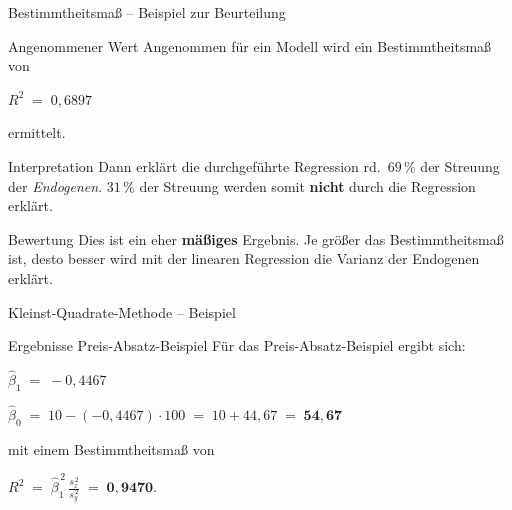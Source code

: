 \documentclass[aspectratio=169,11pt]{beamer}
\begin{document}
\begin{frame}{Bestimmtheitsmaß -- Beispiel zur Beurteilung}
  \begin{block}{Angenommener Wert}
    Angenommen für ein Modell wird ein Bestimmtheitsmaß von
    \begin{center}
      $\displaystyle R^{2} \;=\; 0{,}6897$
    \end{center}
    ermittelt.
  \end{block}

  \begin{exampleblock}{Interpretation}
    Dann erklärt die durchgeführte Regression rd.\ $69\,\%$ der
    Streuung der \emph{Endogenen}. $31\,\%$ der Streuung werden somit
    \textbf{nicht} durch die Regression erklärt.
  \end{exampleblock}

  \begin{alertblock}{Bewertung}
    Dies ist ein eher \textbf{mäßiges} Ergebnis. Je größer das
    Bestimmtheitsmaß ist, desto besser wird mit der linearen
    Regression die Varianz der Endogenen erklärt.
  \end{alertblock}
\end{frame}

\begin{frame}{Kleinst-Quadrate-Methode -- Beispiel}
  \begin{block}{Ergebnisse Preis-Absatz-Beispiel}
    Für das Preis-Absatz-Beispiel ergibt sich:
    \begin{center}
      $\displaystyle
        \hat{\beta}_1 \;=\; -0{,}4467$
    \end{center}
    \begin{center}
      $\displaystyle
        \hat{\beta}_0 \;=\; 10 - (-0{,}4467) \cdot 100
        \;=\; 10 + 44{,}67 \;=\; \mathbf{54{,}67}$
    \end{center}
  \end{block}

  \begin{exampleblock}{mit einem Bestimmtheitsmaß von}
    \begin{center}
      $\displaystyle
        R^{2} \;=\; \hat{\beta}_1^{\,2}\,\frac{s_x^{\,2}}{s_y^{\,2}}
        \;=\; \mathbf{0{,}9470}.$
    \end{center}
  \end{exampleblock}
\end{frame}
\end{document}
